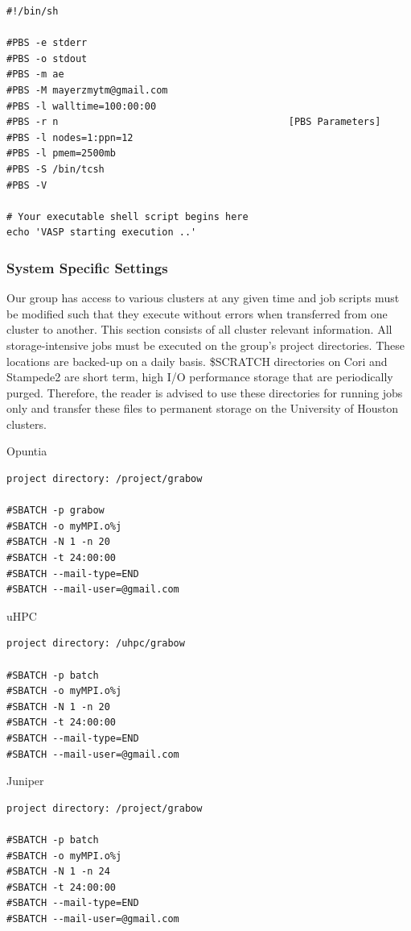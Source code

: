 \documentclass[11pt]{article}
\begin{document}
\begin{verbatim}
#!/bin/sh

#PBS -e stderr
#PBS -o stdout
#PBS -m ae
#PBS -M mayerzmytm@gmail.com
#PBS -l walltime=100:00:00
#PBS -r n                                        [PBS Parameters]
#PBS -l nodes=1:ppn=12
#PBS -l pmem=2500mb
#PBS -S /bin/tcsh
#PBS -V

# Your executable shell script begins here
echo 'VASP starting execution ..'
\end{verbatim}

    \subsubsection{System Specific Settings}\label{system-specific-settings}

Our group has access to various clusters at any given time and job
scripts must be modified such that they execute without errors when
transferred from one cluster to another. This section consists of all
cluster relevant information. All storage-intensive jobs must be
executed on the group's project directories. These locations are
backed-up on a daily basis. \$SCRATCH directories on Cori and Stampede2
are short term, high I/O performance storage that are periodically
purged. Therefore, the reader is advised to use these directories for
running jobs only and transfer these files to permanent storage on the
University of Houston clusters.

    Opuntia

\begin{verbatim}
project directory: /project/grabow

#SBATCH -p grabow
#SBATCH -o myMPI.o%j   
#SBATCH -N 1 -n 20
#SBATCH -t 24:00:00
#SBATCH --mail-type=END
#SBATCH --mail-user=@gmail.com
\end{verbatim}

uHPC

\begin{verbatim}
project directory: /uhpc/grabow

#SBATCH -p batch
#SBATCH -o myMPI.o%j   
#SBATCH -N 1 -n 20
#SBATCH -t 24:00:00
#SBATCH --mail-type=END
#SBATCH --mail-user=@gmail.com  
\end{verbatim}

Juniper

\begin{verbatim}
project directory: /project/grabow

#SBATCH -p batch
#SBATCH -o myMPI.o%j   
#SBATCH -N 1 -n 24
#SBATCH -t 24:00:00
#SBATCH --mail-type=END
#SBATCH --mail-user=@gmail.com 
\end{verbatim}
\end{document}
